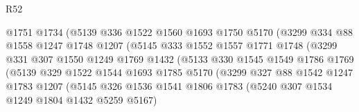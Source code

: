 \begin{lexlean}{R52}
\begin{coremodule}
                                @1751
                                @1734
                                (@5139
                                  @336
                                  @1522
                                  @1560
                                  @1693
                                  @1750
                                  @5170
                                  (@3299
                                    @334
                                    @88
                                    @1558
                                    @1247
                                    @1748
                                    @1207
                                    (@5145
                                      @333
                                      @1552
                                      @1557
                                      @1771
                                      @1748
                                      (@3299
                                        @331
                                        @307
                                        @1550
                                        @1249
                                        @1769
                                        @1432
                                        (@5133
                                          @330
                                          @1545
                                          @1549
                                          @1786
                                          @1769
                                          (@5139
                                            @329
                                            @1522
                                            @1544
                                            @1693
                                            @1785
                                            @5170
                                            (@3299
                                              @327
                                              @88
                                              @1542
                                              @1247
                                              @1783
                                              @1207
                                              (@5145
                                                @326
                                                @1536
                                                @1541
                                                @1806
                                                @1783
                                                (@5240 @307 @1534 @1249 @1804 @1432 @5259 @5167)

\end{coremodule}
\end{lexlean}
